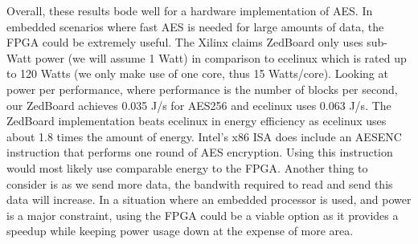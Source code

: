 Overall, these results bode well for a hardware implementation of AES. In embedded scenarios where fast AES is needed for large amounts of data, the FPGA could be extremely useful. The Xilinx claims ZedBoard only uses sub-Watt power (we will assume 1 Watt) in comparison to ecelinux which is rated up to 120 Watts (we only make use of one core, thus 15 Watts/core). Looking at power per performance, where performance is the number of blocks per second, our ZedBoard achieves 0.035 J/s for AES256 and ecelinux uses 0.063 J/s. The ZedBoard implementation beats ecelinux in energy efficiency as ecelinux uses about 1.8 times the amount of energy. Intel's x86 ISA does include an AESENC instruction that performs one round of AES encryption. Using this instruction would most likely use comparable energy to the FPGA. Another thing to consider is as we send more data, the bandwith required to read and send this data will increase. In a situation where an embedded processor is used, and power is a major constraint, using the FPGA could be a viable option as it provides a speedup while keeping power usage down at the expense of more area.
